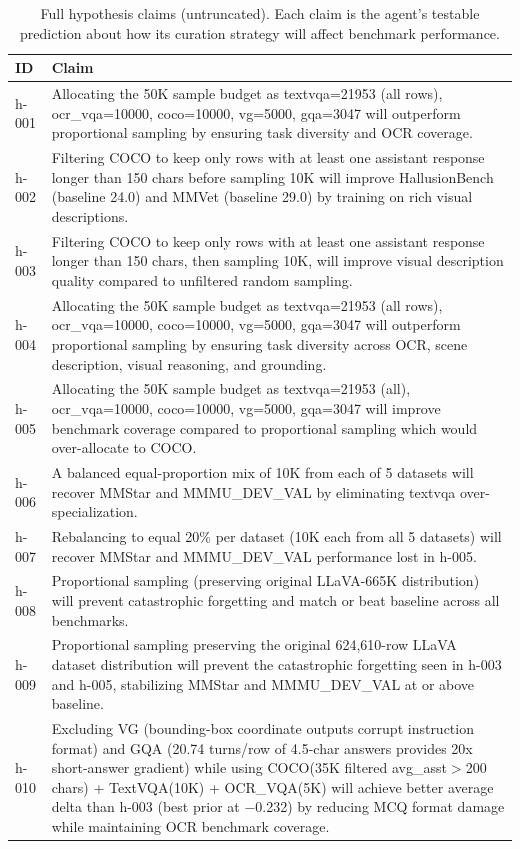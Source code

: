\begin{table}[H]
\centering
\small
\caption{Full hypothesis claims (untruncated). Each claim is the agent's testable prediction about how its curation strategy will affect benchmark performance.}
\label{tab:hyp-claims}
\begin{tabular}{lp{6.2in}}
\toprule
ID & Claim \\
\midrule
h-001 & Allocating the 50K sample budget as textvqa=21953 (all rows), ocr\_vqa=10000, coco=10000, vg=5000, gqa=3047 will outperform proportional sampling by ensuring task diversity and OCR coverage. \\
h-002 & Filtering COCO to keep only rows with at least one assistant response longer than 150 chars before sampling 10K will improve HallusionBench (baseline 24.0) and MMVet (baseline 29.0) by training on rich visual descriptions. \\
h-003 & Filtering COCO to keep only rows with at least one assistant response longer than 150 chars, then sampling 10K, will improve visual description quality compared to unfiltered random sampling. \\
h-004 & Allocating the 50K sample budget as textvqa=21953 (all rows), ocr\_vqa=10000, coco=10000, vg=5000, gqa=3047 will outperform proportional sampling by ensuring task diversity across OCR, scene description, visual reasoning, and grounding. \\
h-005 & Allocating the 50K sample budget as textvqa=21953 (all), ocr\_vqa=10000, coco=10000, vg=5000, gqa=3047 will improve benchmark coverage compared to proportional sampling which would over-allocate to COCO. \\
h-006 & A balanced equal-proportion mix of 10K from each of 5 datasets will recover MMStar and MMMU\_DEV\_VAL by eliminating textvqa over-specialization. \\
h-007 & Rebalancing to equal 20\% per dataset (10K each from all 5 datasets) will recover MMStar and MMMU\_DEV\_VAL performance lost in h-005. \\
h-008 & Proportional sampling (preserving original LLaVA-665K distribution) will prevent catastrophic forgetting and match or beat baseline across all benchmarks. \\
h-009 & Proportional sampling preserving the original 624,610-row LLaVA dataset distribution will prevent the catastrophic forgetting seen in h-003 and h-005, stabilizing MMStar and MMMU\_DEV\_VAL at or above baseline. \\
h-010 & Excluding VG (bounding-box coordinate outputs corrupt instruction format) and GQA (20.74 turns/row of 4.5-char answers provides 20x short-answer gradient) while using COCO(35K filtered avg\_asst$>$200 chars) + TextVQA(10K) + OCR\_VQA(5K) will achieve better average delta than h-003 (best prior at $-$0.232) by reducing MCQ format damage while maintaining OCR benchmark coverage. \\

\end{tabular}
\end{table}
